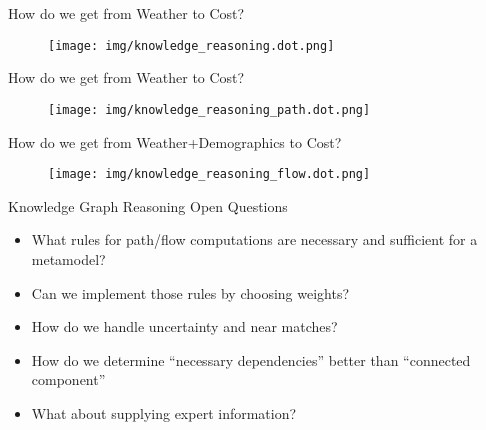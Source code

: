 \documentclass[ignorenonframetext,]{beamer}
\providecommand{\tightlist}{%
  \setlength{\itemsep}{0pt}\setlength{\parskip}{0pt}}
\begin{document}
\begin{frame}{How do we get from Weather to Cost?}
\protect\hypertarget{how-do-we-get-from-weather-to-cost}{}

\begin{figure}
\centering
\texttt{[image: img/knowledge\_reasoning.dot.png]}
\end{figure}

\end{frame}

\begin{frame}{How do we get from Weather to Cost?}
\protect\hypertarget{how-do-we-get-from-weather-to-cost}{}

\begin{figure}
\centering
\texttt{[image: img/knowledge\_reasoning\_path.dot.png]}
\end{figure}

\end{frame}

\begin{frame}{How do we get from Weather+Demographics to Cost?}
\protect\hypertarget{how-do-we-get-from-weatherdemographics-to-cost}{}

\begin{figure}
\centering
\texttt{[image: img/knowledge\_reasoning\_flow.dot.png]}
\end{figure}

\end{frame}

\begin{frame}{Knowledge Graph Reasoning Open Questions}
\protect\hypertarget{knowledge-graph-reasoning-open-questions}{}

\begin{itemize}
\tightlist
\item
  What rules for path/flow computations are necessary and sufficient for
  a metamodel?
\item
  Can we implement those rules by choosing weights?
\item
  How do we handle uncertainty and near matches?
\item
  How do we determine ``necessary dependencies'' better than ``connected
  component''
\item
  What about supplying expert information?
\end{itemize}

\end{frame}
\end{document}
